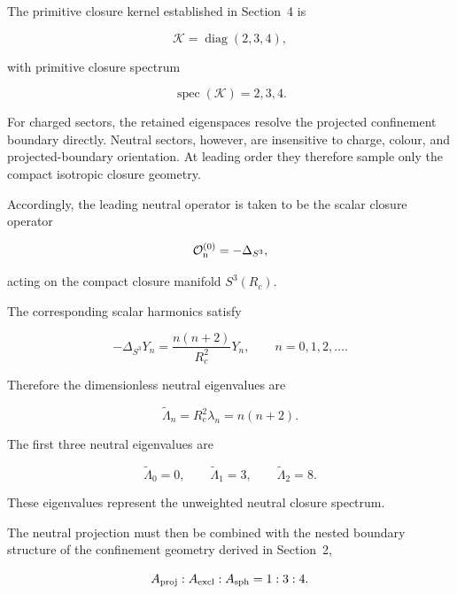 \documentclass[11pt]{article}
\theoremstyle{definition}
\theoremstyle{remark}
\begin{document}
The primitive closure kernel established in Section~4 is

\begin{equation}
\mathcal K =
\operatorname{diag}(2,3,4),
\end{equation}

with primitive closure spectrum

\begin{equation}
\operatorname{spec}(\mathcal K) =
{2,3,4}.
\end{equation}

For charged sectors, the retained eigenspaces resolve the
projected confinement boundary directly. Neutral sectors,
however, are insensitive to charge, colour, and projected-boundary
orientation. At leading order they therefore sample only the
compact isotropic closure geometry.

Accordingly, the leading neutral operator is taken to be the
scalar closure operator

\begin{equation}
\mathcal O_{\rm n}^{(0)} =
-\Delta_{S^3},
\label{eq:neutral_scalar_operator}
\end{equation}

acting on the compact closure manifold \(S^3(R_c)\).

The corresponding scalar harmonics satisfy

\begin{equation}
-\Delta_{S^3}Y_n =
\frac{n(n+2)}{R_c^2}Y_n,
\qquad
n=0,1,2,\ldots .
\end{equation}

Therefore the dimensionless neutral eigenvalues are

\begin{equation}
\widetilde{\Lambda}_n = R_c^2\lambda_n
= n(n+2).
\end{equation}

The first three neutral eigenvalues are

\begin{equation}
\widetilde{\Lambda}_0 = 
0,
\qquad
\widetilde{\Lambda}_1 =
3,
\qquad
\widetilde{\Lambda}_2 =
8.
\label{eq:neutral_unweighted_spectrum}
\end{equation}

These eigenvalues represent the unweighted neutral closure
spectrum.

The neutral projection must then be combined with the nested
boundary structure of the confinement geometry derived in
Section~2,

\begin{equation}
A_{\rm proj}
:
A_{\rm excl}
:
A_{\rm sph} =
1
:
3
:
4.
\end{equation}
\end{document}
